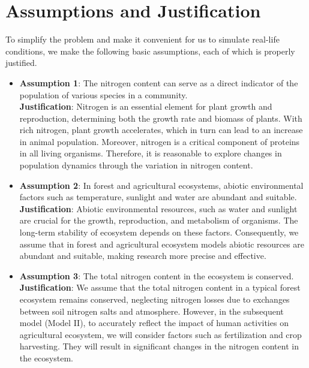 \documentclass{mcmthesis}
\begin{document}
\section{Assumptions and Justification}

To simplify the problem and make it convenient for us to simulate real-life conditions, we make the following basic assumptions, each of which is properly justified.
\begin{itemize}

\item {\bf Assumption 1}: The nitrogen content can serve as a direct indicator of the population of various species in a community.           \\
\textbf{Justification}: Nitrogen is an essential element for plant growth and reproduction, determining both the growth rate and biomass of plants. With rich nitrogen, plant growth accelerates, which in turn can lead to an increase in animal population. Moreover, nitrogen is a critical component of proteins in all living organisms. Therefore, it is reasonable to explore changes in population dynamics through the variation in nitrogen content.

\item {\bf Assumption 2}: In forest and agricultural ecosystems, abiotic environmental factors such as temperature, sunlight and water are abundant and suitable.           \\
\textbf{Justification}: Abiotic environmental resources, such as water and sunlight are crucial for the growth, reproduction, and metabolism of organisms. The long-term stability of ecosystem depends on these factors. Consequently, we assume that in forest and agricultural ecosystem models abiotic resources are abundant and suitable, making research more precise and effective.

\item {\bf Assumption 3}: The total nitrogen content in the ecosystem is conserved.            \\
\textbf{Justification}: We assume that the total nitrogen content in a typical forest ecosystem remains conserved, neglecting nitrogen losses due to exchanges between soil nitrogen salts and atmosphere. However, in the subsequent model (Model II), to accurately reflect the impact of human activities on agricultural ecosystem, we will consider factors such as fertilization and crop harvesting. They will result in significant changes in the nitrogen content in the ecosystem.
\end{itemize}
\end{document}
